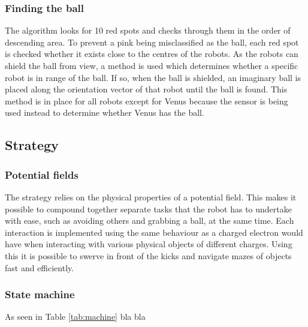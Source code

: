 \documentclass[a4paper,12pt]{article}
\begin{document}
\subsubsection{Finding the ball}

The algorithm looks for 10 red spots and checks through them in the order of descending area. To prevent a pink being misclassified as the ball, each red spot is checked whether it exists close to the centres of the robots. As the robots can shield the ball from view, a method is used which determines whether a specific robot is in range of the ball. If so, when the ball is shielded, an imaginary ball is placed along the orientation vector of that robot until the ball is found. This method is in place for all robots except for Venus because the sensor is being used instead to determine whether Venus has the ball.

\subsection{Strategy}

\subsubsection{Potential fields}

The strategy relies on the physical properties of a potential field. This makes it possible to compound together separate tasks that the robot has to undertake with ease, such as avoiding others and grabbing a ball, at the same time. Each interaction is implemented using the same behaviour as a charged electron would have when interacting with various physical objects of different charges. Using this it is possible to swerve in front of the kicks and navigate mazes of objects fast and efficiently. 

\subsubsection{State machine}

As seen in Table \ref{tab:machine} bla bla
\end{document}
